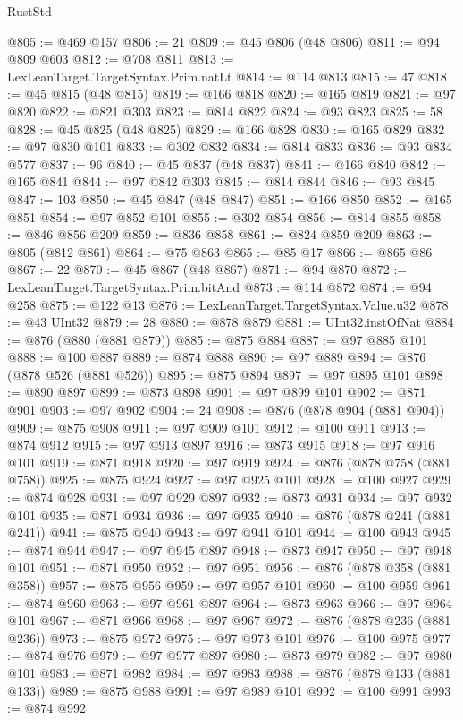 \begin{lexlean}{RustStd}
\begin{coremodule}
@805 := @469 @157
@806 := 21
@809 := @45 @806 (@48 @806)
@811 := @94 @809 @603
@812 := @708 @811
@813 := LexLeanTarget.TargetSyntax.Prim.natLt
@814 := @114 @813
@815 := 47
@818 := @45 @815 (@48 @815)
@819 := @166 @818
@820 := @165 @819
@821 := @97 @820
@822 := @821 @303
@823 := @814 @822
@824 := @93 @823
@825 := 58
@828 := @45 @825 (@48 @825)
@829 := @166 @828
@830 := @165 @829
@832 := @97 @830 @101
@833 := @302 @832
@834 := @814 @833
@836 := @93 @834 @577
@837 := 96
@840 := @45 @837 (@48 @837)
@841 := @166 @840
@842 := @165 @841
@844 := @97 @842 @303
@845 := @814 @844
@846 := @93 @845
@847 := 103
@850 := @45 @847 (@48 @847)
@851 := @166 @850
@852 := @165 @851
@854 := @97 @852 @101
@855 := @302 @854
@856 := @814 @855
@858 := @846 @856 @209
@859 := @836 @858
@861 := @824 @859 @209
@863 := @805 (@812 @861)
@864 := @75 @863
@865 := @85 @17
@866 := @865 @86
@867 := 22
@870 := @45 @867 (@48 @867)
@871 := @94 @870
@872 := LexLeanTarget.TargetSyntax.Prim.bitAnd
@873 := @114 @872
@874 := @94 @258
@875 := @122 @13
@876 := LexLeanTarget.TargetSyntax.Value.u32
@878 := @43 UInt32
@879 := 28
@880 := @878 @879
@881 := UInt32.instOfNat
@884 := @876 (@880 (@881 @879))
@885 := @875 @884
@887 := @97 @885 @101
@888 := @100 @887
@889 := @874 @888
@890 := @97 @889
@894 := @876 (@878 @526 (@881 @526))
@895 := @875 @894
@897 := @97 @895 @101
@898 := @890 @897
@899 := @873 @898
@901 := @97 @899 @101
@902 := @871 @901
@903 := @97 @902
@904 := 24
@908 := @876 (@878 @904 (@881 @904))
@909 := @875 @908
@911 := @97 @909 @101
@912 := @100 @911
@913 := @874 @912
@915 := @97 @913 @897
@916 := @873 @915
@918 := @97 @916 @101
@919 := @871 @918
@920 := @97 @919
@924 := @876 (@878 @758 (@881 @758))
@925 := @875 @924
@927 := @97 @925 @101
@928 := @100 @927
@929 := @874 @928
@931 := @97 @929 @897
@932 := @873 @931
@934 := @97 @932 @101
@935 := @871 @934
@936 := @97 @935
@940 := @876 (@878 @241 (@881 @241))
@941 := @875 @940
@943 := @97 @941 @101
@944 := @100 @943
@945 := @874 @944
@947 := @97 @945 @897
@948 := @873 @947
@950 := @97 @948 @101
@951 := @871 @950
@952 := @97 @951
@956 := @876 (@878 @358 (@881 @358))
@957 := @875 @956
@959 := @97 @957 @101
@960 := @100 @959
@961 := @874 @960
@963 := @97 @961 @897
@964 := @873 @963
@966 := @97 @964 @101
@967 := @871 @966
@968 := @97 @967
@972 := @876 (@878 @236 (@881 @236))
@973 := @875 @972
@975 := @97 @973 @101
@976 := @100 @975
@977 := @874 @976
@979 := @97 @977 @897
@980 := @873 @979
@982 := @97 @980 @101
@983 := @871 @982
@984 := @97 @983
@988 := @876 (@878 @133 (@881 @133))
@989 := @875 @988
@991 := @97 @989 @101
@992 := @100 @991
@993 := @874 @992

\end{coremodule}
\end{lexlean}
